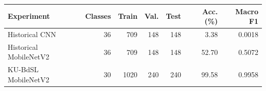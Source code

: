 \begin{tabular}{lrrrrrr}\toprule Experiment & Classes & Train & Val. & Test & Acc. (\%) & Macro F1 \\\midrule
Historical CNN & 36 & 709 & 148 & 148 & 3.38 & 0.0018 \\
Historical MobileNetV2 & 36 & 709 & 148 & 148 & 52.70 & 0.5072 \\
KU-BdSL MobileNetV2 & 30 & 1020 & 240 & 240 & 99.58 & 0.9958 \\
\bottomrule\end{tabular}